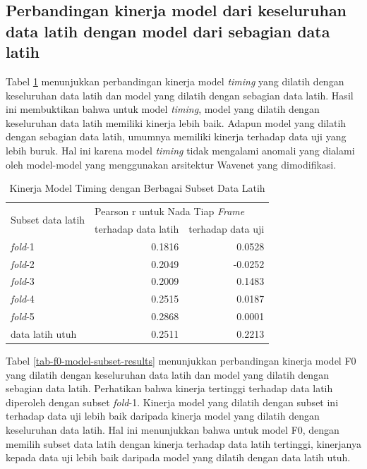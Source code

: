\subsection{Perbandingan kinerja model dari keseluruhan data latih dengan model dari sebagian data latih}

Tabel \ref{tab-timing-model-subset-results} menunjukkan perbandingan kinerja model \textit{timing} yang dilatih dengan keseluruhan data latih dan model yang dilatih dengan sebagian data latih. Hasil ini membuktikan bahwa untuk model \textit{timing}, model yang dilatih dengan keseluruhan data latih memiliki kinerja lebih baik. Adapun model yang dilatih dengan sebagian data latih, umumnya memiliki kinerja terhadap data uji yang lebih buruk. Hal ini karena model \textit{timing} tidak mengalami anomali yang dialami oleh model-model yang menggunakan arsitektur Wavenet yang dimodifikasi.

\begin{table}[htbp]
    \centering
    \caption{Kinerja Model Timing dengan Berbagai Subset Data Latih}\label{tab-timing-model-subset-results}
    \begin{tabular}{ |l|r|r| } 
     \hline
     \multirow{2}{*}{Subset data latih} & \multicolumn{2}{l|}{Pearson r untuk Nada Tiap \textit{Frame}} \\
     \cline{2-3}
     & terhadap data latih & terhadap data uji \\\hline

	\textit{fold}-1          &0.1816  &0.0528\\\hline
	\textit{fold}-2          &0.2049 &-0.0252\\\hline
	\textit{fold}-3          &0.2009  &0.1483\\\hline
	\textit{fold}-4          &0.2515  &0.0187\\\hline
	\textit{fold}-5          &0.2868  &0.0001\\\hline
	data latih utuh			 &0.2511  &0.2213\\\hline
    \end{tabular}
\end{table}

Tabel \ref{tab-f0-model-subset-results} menunjukkan perbandingan kinerja model F0 yang dilatih dengan keseluruhan data latih dan model yang dilatih dengan sebagian data latih. Perhatikan bahwa kinerja tertinggi terhadap data latih diperoleh dengan subset \textit{fold}-1. Kinerja model yang dilatih dengan subset ini terhadap data uji lebih baik daripada kinerja model yang dilatih dengan keseluruhan data latih. Hal ini menunjukkan bahwa untuk model F0, dengan memilih subset data latih dengan kinerja terhadap data latih tertinggi, kinerjanya kepada data uji lebih baik daripada model yang dilatih dengan data latih utuh. 

